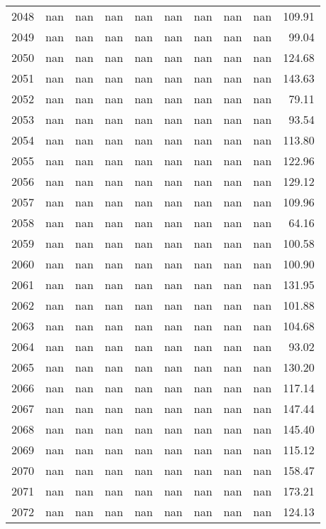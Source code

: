 \begin{tabular}{lrrrrrrrrr}
2048 & nan & nan & nan & nan & nan & nan & nan & nan & 109.91 \\
2049 & nan & nan & nan & nan & nan & nan & nan & nan & 99.04 \\
2050 & nan & nan & nan & nan & nan & nan & nan & nan & 124.68 \\
2051 & nan & nan & nan & nan & nan & nan & nan & nan & 143.63 \\
2052 & nan & nan & nan & nan & nan & nan & nan & nan & 79.11 \\
2053 & nan & nan & nan & nan & nan & nan & nan & nan & 93.54 \\
2054 & nan & nan & nan & nan & nan & nan & nan & nan & 113.80 \\
2055 & nan & nan & nan & nan & nan & nan & nan & nan & 122.96 \\
2056 & nan & nan & nan & nan & nan & nan & nan & nan & 129.12 \\
2057 & nan & nan & nan & nan & nan & nan & nan & nan & 109.96 \\
2058 & nan & nan & nan & nan & nan & nan & nan & nan & 64.16 \\
2059 & nan & nan & nan & nan & nan & nan & nan & nan & 100.58 \\
2060 & nan & nan & nan & nan & nan & nan & nan & nan & 100.90 \\
2061 & nan & nan & nan & nan & nan & nan & nan & nan & 131.95 \\
2062 & nan & nan & nan & nan & nan & nan & nan & nan & 101.88 \\
2063 & nan & nan & nan & nan & nan & nan & nan & nan & 104.68 \\
2064 & nan & nan & nan & nan & nan & nan & nan & nan & 93.02 \\
2065 & nan & nan & nan & nan & nan & nan & nan & nan & 130.20 \\
2066 & nan & nan & nan & nan & nan & nan & nan & nan & 117.14 \\
2067 & nan & nan & nan & nan & nan & nan & nan & nan & 147.44 \\
2068 & nan & nan & nan & nan & nan & nan & nan & nan & 145.40 \\
2069 & nan & nan & nan & nan & nan & nan & nan & nan & 115.12 \\
2070 & nan & nan & nan & nan & nan & nan & nan & nan & 158.47 \\
2071 & nan & nan & nan & nan & nan & nan & nan & nan & 173.21 \\
2072 & nan & nan & nan & nan & nan & nan & nan & nan & 124.13 \\

\end{tabular}
